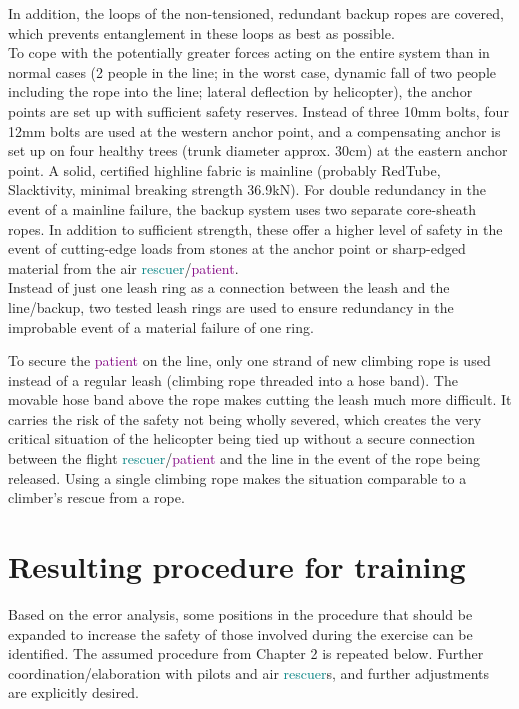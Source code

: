 \documentclass[a4paper,10pt]{scrartcl}
\begin{document}
In addition, the loops of the non-tensioned, redundant backup ropes are covered, which prevents entanglement in these
loops as best as possible.\\
To cope with the potentially greater forces acting on the entire system than in normal cases (2 people in the line; in the worst case, dynamic fall of two people including the rope into the line; lateral deflection by helicopter), the anchor points are set up with sufficient safety reserves. Instead of three 10mm bolts, four 12mm bolts are used at the western
anchor point, and a compensating anchor is set up on four healthy trees (trunk diameter approx. 30cm) at the eastern anchor point. A solid, certified highline fabric is mainline (probably RedTube, Slacktivity, minimal breaking strength 36.9kN). For double redundancy in the event of a mainline failure, the backup system uses two separate
core-sheath ropes. In addition to sufficient strength, these offer a higher level of safety in the event of cutting-edge loads from stones at the anchor point or sharp-edged material from the air \textcolor{teal}{rescuer}/\textcolor{purple}{patient}. \\

Instead of just one leash ring as a connection between the leash and the line/backup, two tested leash rings are used to ensure redundancy in the improbable event of a material failure of one ring.

To secure the \textcolor{purple}{patient} on the line, only one strand of new climbing rope is used instead of a regular leash (climbing rope
threaded into a hose band). The movable hose band above the rope makes cutting the leash much more difficult. It carries the risk of the safety not being wholly severed, which creates the very critical situation of the helicopter being tied up without a secure connection between the flight \textcolor{teal}{rescuer}/\textcolor{purple}{patient} and the line in the event of the rope being released. Using a single climbing rope makes the situation comparable to a climber's rescue from a rope.

\section{Resulting procedure for training}
\label{sec:result}

Based on the error analysis, some positions in the procedure that should be expanded to increase
the safety of those involved during the exercise can be identified. The assumed procedure from Chapter 2 is repeated below.
Further coordination/elaboration with pilots and air \textcolor{teal}{rescuer}s, and further adjustments are explicitly
desired.
\end{document}
